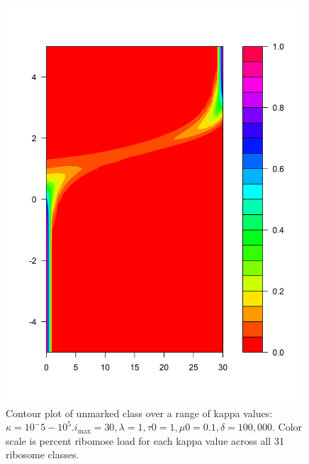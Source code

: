 \documentclass[review]{elsarticle}
\newcommand{\imax}{\ensuremath{i_{\max}}\xspace}
\begin{document}
\begin{enumerate}
\begin{enumerate}
		\begin{figure}[ht]
		\centering
		\includegraphics[width=30em]{Images/contour_norm_unmarked_l1m1d1t1_k1e-5_1e5_imax_30}
		\caption{Contour plot of unmarked class over a range of kappa values: $\kappa = 10^-5 - 10^5.\imax=30,\lambda=1,\tau 0=1,\mu 0=0.1,\delta=100,000$. Color scale is percent ribomose load for each kappa value across all 31 ribosome classes.}
		\end{figure}


\end{enumerate}
\end{enumerate}
\end{document}
